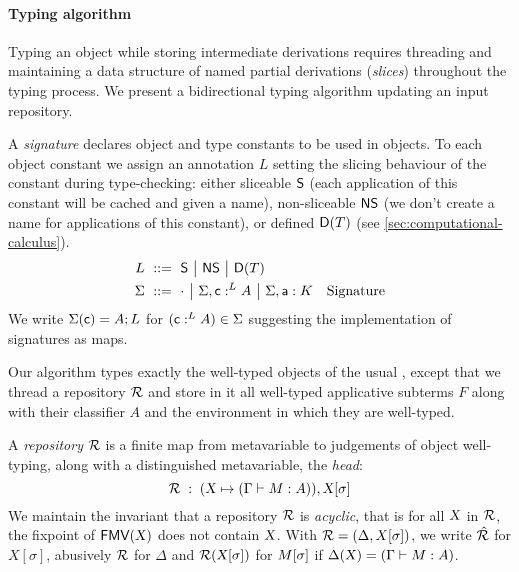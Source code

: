 \documentclass[9pt]{sigplanconf}
\begin{document}

\paragraph{Typing algorithm}

Typing an object while storing intermediate derivations requires
threading and maintaining a data structure of named partial
derivations (\emph{slices}) throughout the typing process. We present
a bidirectional typing algorithm updating an input repository.

A \emph{signature} declares object and type constants to be used in
objects. To each object constant we assign an annotation $L$ setting
the slicing behaviour of the constant during type-checking: either
sliceable $\mathsf{S}$ (each application of this constant will be
cached and given a name), non-sliceable $\mathsf{NS}$ (we don't
create a name for applications of this constant), or defined
$\mathsf{D}({T})$ (see \ref{sec:computational-calculus}).
\begin{align*}
  L &\ ::=\ 
  \mathsf{S} \ {\big|}\ 
  \mathsf{NS} \ {\big|}\ 
  \mathsf{D}({T})
  \\
  \Sigma &\ ::=\ 
  \cdot \ {\big|}\ 
  {\Sigma},{\text{\textsf{c}} :^L A} \ {\big|}\ 
  {\Sigma},{\text{\textsf{a}} : K}
  &\text{Signature}
\end{align*}
We write $\Sigma(\text{\textsf{c}}) = A; L$ for $(\text{\textsf{c}} :^L A) \in \Sigma$
suggesting the implementation of signatures as maps.

Our algorithm types exactly the well-typed objects of the usual
\LF, except that we thread a repository $\mathcal{R}$ and store in it
all well-typed applicative subterms $F$ along with their classifier
$A$ and the environment in which they are well-typed.


A \emph{repository} $\mathcal{R}$ is a finite map from metavariable to
judgements of object well-typing, along with a distinguished
metavariable, the \emph{head}:
$$ \mathcal{R}\;:\;(\text{\textsl{X}} \mapsto (\Gamma\vdash{M}:{A})), {\text{\textsl{X}}}[{\sigma}] $$
We maintain the invariant that a repository $\mathcal{R}$ is
\emph{acyclic}, that is for all $\text{\textsl{X}}$ in $\mathcal{R}$, the fixpoint
of ${\text{\textsf{FMV}}}({\text{\textsl{X}}})$ does not contain $\text{\textsl{X}}$. With $\mathcal{R} =
(\Delta, X[\sigma])$, we write $\hat {\mathcal{R}}$ for $X[\sigma]$,
abusively $\mathcal{R}$ for $\Delta$ and $\mathcal{R} ({\text{\textsl{X}}}[{\sigma}])$ for
${M}[{\sigma}]$ if $\Delta(\text{\textsl{X}}) = (\Gamma\vdash M : A)$.
\end{document}
